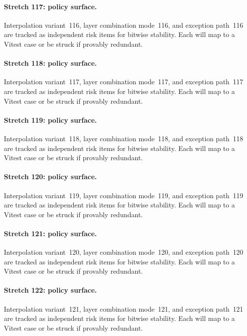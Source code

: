 \documentclass[sigconf,nonacm]{acmart}
\begin{document}
\paragraph{Stretch 117: policy surface.}
Interpolation variant~116, layer combination mode~116, and exception path~116 are tracked as independent risk items for bitwise stability. Each will map to a Vitest case or be struck if provably redundant. %

\paragraph{Stretch 118: policy surface.}
Interpolation variant~117, layer combination mode~117, and exception path~117 are tracked as independent risk items for bitwise stability. Each will map to a Vitest case or be struck if provably redundant. %

\paragraph{Stretch 119: policy surface.}
Interpolation variant~118, layer combination mode~118, and exception path~118 are tracked as independent risk items for bitwise stability. Each will map to a Vitest case or be struck if provably redundant. %

\paragraph{Stretch 120: policy surface.}
Interpolation variant~119, layer combination mode~119, and exception path~119 are tracked as independent risk items for bitwise stability. Each will map to a Vitest case or be struck if provably redundant. %

\paragraph{Stretch 121: policy surface.}
Interpolation variant~120, layer combination mode~120, and exception path~120 are tracked as independent risk items for bitwise stability. Each will map to a Vitest case or be struck if provably redundant. %

\paragraph{Stretch 122: policy surface.}
Interpolation variant~121, layer combination mode~121, and exception path~121 are tracked as independent risk items for bitwise stability. Each will map to a Vitest case or be struck if provably redundant. %
\end{document}
